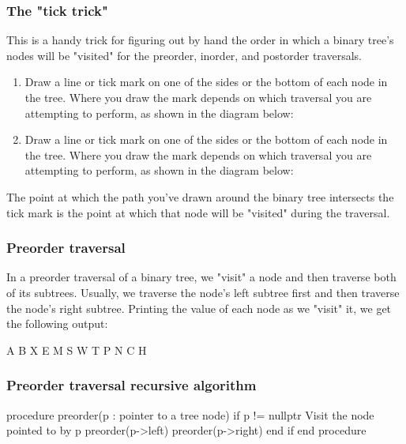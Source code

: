 \documentclass{report}
\begin{document}
    \bigbreak \noindent 
    \subsubsection{The "tick trick"}
    \bigbreak \noindent 
    \begin{concept}
        This is a handy trick for figuring out by hand the order in which a binary tree's nodes will be "visited" for the preorder, inorder, and postorder traversals.
        \begin{enumerate}
            \item Draw a line or tick mark on one of the sides or the bottom of each node in the tree. Where you draw the mark depends on which traversal you are attempting to perform, as shown in the diagram below:
            \item Draw a line or tick mark on one of the sides or the bottom of each node in the tree. Where you draw the mark depends on which traversal you are attempting to perform, as shown in the diagram below:
        \end{enumerate}
    \end{concept}
    \bigbreak \noindent 
    \bigbreak \noindent 
    The point at which the path you've drawn around the binary tree intersects the tick mark is the point at which that node will be "visited" during the traversal.
    \bigbreak \noindent 
    \subsubsection{Preorder traversal}
    \bigbreak \noindent 
    In a preorder traversal of a binary tree, we "visit" a node and then traverse both of its subtrees. Usually, we traverse the node's left subtree first and then traverse the node's right subtree.
    \bigbreak \noindent 
    \bigbreak \noindent 
    Printing the value of each node as we "visit" it, we get the following output:
    \begin{center}
        A B X E M S W T P N C H
    \end{center}
    \bigbreak \noindent 
    \subsubsection{Preorder traversal recursive algorithm}
    \bigbreak \noindent 
    \begin{cppcode}
    procedure preorder(p : pointer to a tree node)
        if p != nullptr
            Visit the node pointed to by p
            preorder(p->left)
            preorder(p->right)
        end if
    end procedure
    \end{cppcode}
    \bigbreak \noindent 
    \bigbreak \noindent 
    \pagebreak 
\end{document}
